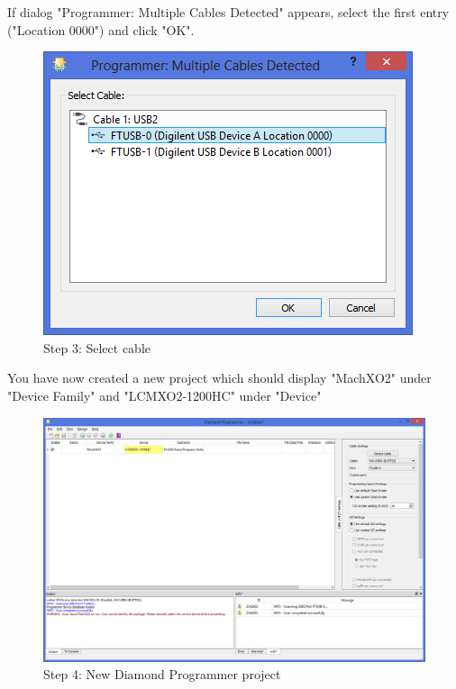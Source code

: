 If dialog "Programmer: Multiple Cables Detected" appears, select the first entry ("Location 0000") and click "OK".

\begin{figure}
  \includegraphics[width=\linewidth]{images/diamond03.png}
  \caption{Step 3: Select cable}
  \label{fig:diamond03}
\end{figure}

You have now created a new project which should display "MachXO2" under "Device Family" and "LCMXO2-1200HC" under "Device"

\begin{figure}
  \includegraphics[width=\linewidth]{images/diamond04.png}
  \caption{Step 4: New Diamond Programmer project}
  \label{fig:diamond04}
\end{figure}

